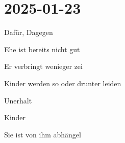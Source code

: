 \section{2025-01-23}

\startplacetable[location={here},title={Scheidung Argumentation}]
\bTABLE
\startCSV
Dafür, Dagegen
\stopCSV
\bTR
\bTD %
\startitemize[packed]
\item Ehe ist bereits nicht gut
\item Er verbringt wenieger zei
\item Kinder werden so oder drunter leiden
\item Unerhalt
\stopitemize
\eTD

\bTD %
\startitemize[packed]
\item Kinder
\item Sie ist von ihm abhängel
\stopitemize
\eTD
\eTR

\eTABLE
\stopplacetable
